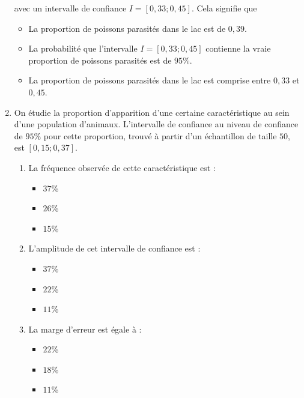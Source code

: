 \documentclass[11pt]{article}
\begin{document}
\begin{enumerate}
  avec un intervalle de confiance $I=\left[ 0,33 ; 0,45 \right]$. Cela
  signifie que
  \begin{itemize}[label=$\Box$]
    \item La proportion de poissons parasités dans le lac est de $0,39$.
    \item La probabilité que l'intervalle $I=\left[ 0,33 ; 0,45 \right]$
      contienne la vraie proportion de poissons parasités est de $95$\%.
    \item La proportion de poissons parasités dans le lac est comprise entre
      $0,33$ et $0,45$.
  \end{itemize}
\item On étudie la proportion d'apparition d'une certaine caractéristique au
  sein d'une population d'animaux. L'intervalle de confiance au niveau de
  confiance de $95$\% pour cette proportion, trouvé à partir d'un échantillon de
  taille $50$, est $\left[ 0,15 ; 0,37 \right]$.
  \begin{enumerate}
    \item La fréquence observée de cette caractéristique est :
      \begin{multicols}{3}
        \begin{itemize}[label=$\Box$]
          \item $37$\%
          \item $26$\%
          \item $15$\%
        \end{itemize}
      \end{multicols}
    \item L'amplitude de cet intervalle de confiance est :
      \begin{multicols}{3}
        \begin{itemize}[label=$\Box$]
          \item $37$\%
          \item $22$\%
          \item $11$\%
        \end{itemize}
      \end{multicols}
    \item La marge d'erreur est égale à :
      \begin{multicols}{3}
        \begin{itemize}[label=$\Box$]
          \item $22$\%
          \item $18$\%
          \item $11$\%
        \end{itemize}

\end{multicols}
\end{enumerate}
\end{enumerate}
\end{document}

